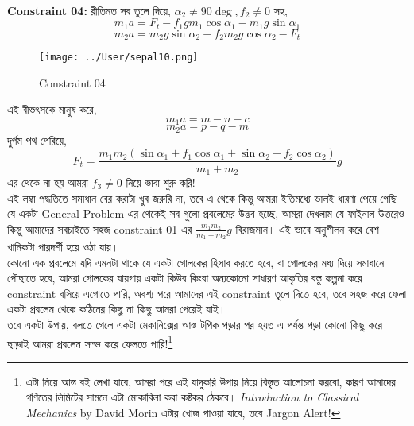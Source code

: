 \documentclass[12pt,a4paper]{article}
\begin{document}
\\
%
%
\textbf{Constraint 04:} রীতিমত সব তুলে দিয়ে, $\alpha_2 \neq 90 \deg, f_2 \neq 0$ সহ,
\[ m_1 a = F_t - f_1 g m_1 \cos \alpha_1 - m_1g \sin \alpha_1 \]
\[ m_2 a = m_2 g \sin \alpha_2 - f_2m_2 g \cos \alpha_2 - F_t \]
\begin{figure}[hbtp]
\centering
\texttt{[image: ../User/sepal10.png]}
\caption{Constraint 04}
\end{figure}
এই বীভৎসকে মানুষ করে, 
\[ m_1 a = m - n - c \]
\[ m_2 a = p - q - m \]
দুর্গম পথ পেরিয়ে, 
\[F_t = \frac{m_1 m_2 (\sin \alpha_1 + f_1 \cos \alpha_1 + \sin \alpha_2 - f_2 \cos\alpha_2)}{m_1 + m_2}  g \]
এর থেকে না হয় আমরা $f_3 \neq 0$ নিয়ে ভাবা শুরু করি!  \\
এই লম্বা পদ্ধতিতে সমাধান বের করাটা খুব জরুরি না, তবে এ থেকে কিন্তু আমরা ইতিমধ্যে ভালই ধারণা পেয়ে গেছি যে একটা General Problem এর থেকেই সব গুলো প্রবলেমের উদ্ভব হচ্ছে, আমরা দেখলাম যে ফাইনাল উত্তরেও কিন্তু আমাদের সবচাইতে সহজ constraint 01 এর $\frac{m_1 m_2}{m_1 + m_2}g$ বিরাজমান। এই ভাবে অনুশীলন করে বেশ খানিকটা পারদর্শী হয়ে ওঠা যায়। \\
%
কোনো এক প্রবলেমে যদি এমনটা থাকে যে একটা গোলকের হিসাব করতে হবে, বা গোলকের মধ্য দিয়ে সমাধানে পৌছাতে হবে, আমরা গোলকের যায়গায় একটা কিউব কিংবা অন্যকোনো সাধারণ আকৃতির বস্তু কল্পনা করে constraint বসিয়ে এগোতে পারি, অবশ্য পরে আমাদের এই constraint তুলে দিতে হবে, তবে সহজ করে ফেলা একটা প্রবলেম থেকে কঠিনের কিছু না কিছু আমরা পেয়েই যাই। \\
তবে একটা উপায়, বলতে গেলে একটা মেকানিক্সের আস্ত টপিক পড়ার পর হয়ত এ পর্যন্ত পড়া কোনো কিছু করে ছাড়াই আমরা প্রবলেম সল্ভ করে ফেলতে পারি!\footnote{এটা নিয়ে আস্ত বই লেখা যাবে, আমরা পরে এই যাদুকরি উপায় নিয়ে বিস্তৃত আলোচনা করবো, কারণ আমাদের গণিতের লিমিটের  সামনে এটা মোকাবিলা করা কষ্টকর ঠেকবে। \emph{Introduction to Classical Mechanics} by David Morin এটার খোজ পাওয়া যাবে, তবে Jargon Alert!}


 
\end{document}
